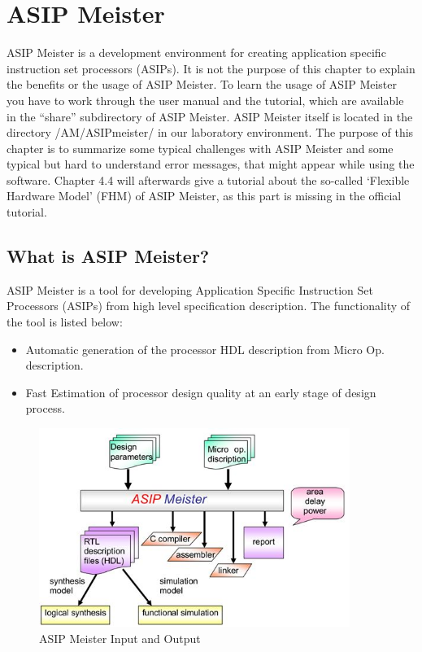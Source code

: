 \hypertarget{asip-meister}{%
\chapter{ASIP Meister}\label{asip-meister}}
ASIP Meister \cite{ASIPMeister} is a development environment for creating
application specific instruction set processors (ASIPs). It is not the
purpose of this chapter to explain the benefits or the usage of ASIP
Meister. To learn the usage of ASIP Meister you have to work through the
user manual and the tutorial, which are available in the ``share''
subdirectory of ASIP Meister. ASIP Meister itself is located in the
directory /AM/ASIPmeister/ in our laboratory environment. The purpose of
this chapter is to summarize some typical challenges with ASIP Meister
and some typical but hard to understand error messages, that might
appear while using the software. Chapter 4.4 will afterwards give a
tutorial about the so-called `Flexible Hardware Model' (FHM) of ASIP
Meister, as this part is missing in the official tutorial.
\hypertarget{what-is-asip-meister}{%
\section{What is ASIP Meister?}\label{what-is-asip-meister}}
ASIP Meister is a tool for developing Application Specific Instruction
Set Processors (ASIPs) from high level specification description. The
functionality of the tool is listed below:
\begin{itemize}
\item
  Automatic generation of the processor HDL description from Micro Op.
  description.
\item
  Fast Estimation of processor design quality at an early stage of
  design process.
\end{itemize}
\begin{figure}[!htb]
	\centering
	\includegraphics[width=0.9\textwidth]{src/images/4-1.png}
	\caption{ASIP Meister Input and Output}
	\label{fig:fig41}
\end{figure}
